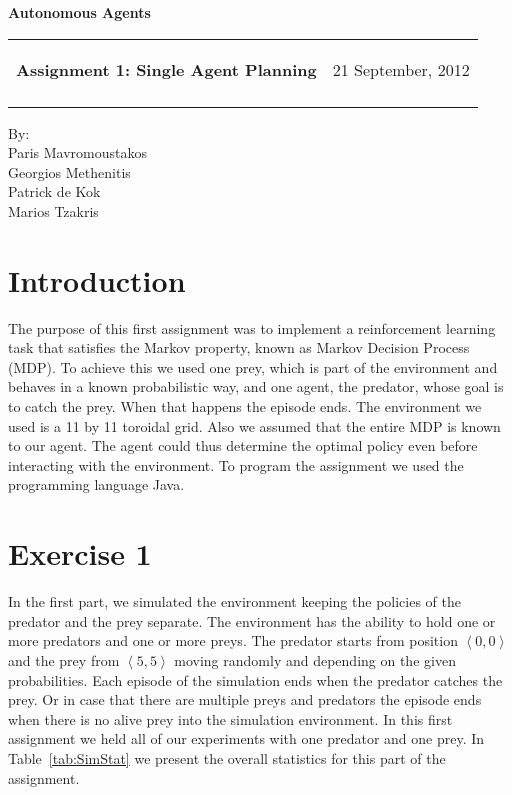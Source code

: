 \documentclass[a4paper,11pt]{article}
\makeatletter
\newcommand{\resheading}[1]{{\large \colorbox{mygrey}{\begin{minipage}{\textwidth}{\textbf{#1 \vphantom{p\^{E}}}}\end{minipage}}}}
\newcommand{\mywebheader}{
  \begin{tabular}{@{}p{5in}p{4in}}
  {\resheading{Assignment 1: Single Agent Planning}} & {\Large 21 September, 2012}\\\vspace{0.2cm}
  \end{tabular}}
\makeatother
\begin{document}
\begin{center}
{\LARGE \textbf{Autonomous Agents}}\\ [1em]
\end{center}
\mywebheader

\begin{center}
{\Large By:} \\ \vspace{0.1cm}
{\Large Paris Mavromoustakos} \\  \vspace{0.1cm}
{\Large Georgios Methenitis} \\ \vspace{0.1cm}
{\Large Patrick de Kok} \\ \vspace{0.1cm}
{\Large Marios Tzakris}
\end{center}




\section*{Introduction}
The purpose of this first assignment was to implement a reinforcement learning task that satisfies the Markov property, known as Markov Decision Process (MDP). To achieve this we used one prey, which is part of the environment and behaves in a known probabilistic way, and one agent, the predator, whose goal is to catch the prey. When that happens the episode ends. The environment we used is a 11 by 11 toroidal grid. Also we assumed that the entire MDP is known to our agent. The agent could thus determine the optimal policy even before interacting with the environment. To program the assignment we used the programming language Java.






\section*{Exercise 1}
In the first part, we simulated the environment keeping the policies of the predator and the prey separate. The environment has the ability to hold one or more predators and one or more preys. The predator starts from position $\left<0,0\right>$ and the prey from $\left<5,5\right>$ moving randomly and depending on the given probabilities. Each episode of the simulation ends when the predator catches the prey. Or in case that there are multiple preys and predators the episode ends when there is no alive prey into the simulation environment. In this first assignment we held all of our experiments with one predator and one prey. In Table~\ref{tab:SimStat} we present the overall statistics for this part of the assignment.
\end{document}
